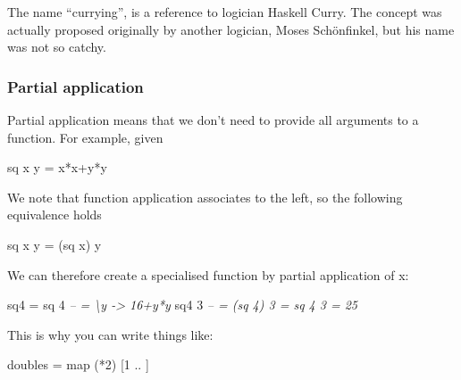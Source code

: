 \documentclass[11pt]{amsart}
\newenvironment{Shaded}{}{}
\newcommand{\DecValTok}[1]{\textcolor[rgb]{0.25,0.63,0.44}{{#1}}}
\newcommand{\CommentTok}[1]{\textcolor[rgb]{0.38,0.63,0.69}{\textit{{#1}}}}
\newcommand{\FunctionTok}[1]{\textcolor[rgb]{0.02,0.16,0.49}{{#1}}}
\newcommand{\NormalTok}[1]{{#1}}
\begin{document}
The name ``currying'', is a reference to logician Haskell Curry. The
concept was actually proposed originally by another logician, Moses
Schönfinkel, but his name was not so catchy.

\subsubsection{Partial application}\label{partial-application}

Partial application means that we don't need to provide all arguments to
a function. For example, given

\begin{Shaded}
\begin{Highlighting}[]
    \NormalTok{sq x y }\FunctionTok{=} \NormalTok{x}\FunctionTok{*}\NormalTok{x}\FunctionTok{+}\NormalTok{y}\FunctionTok{*}\NormalTok{y}
\end{Highlighting}
\end{Shaded}

We note that function application associates to the left, so the
following equivalence holds

\begin{Shaded}
\begin{Highlighting}[]
    \NormalTok{sq x y }\FunctionTok{=} \NormalTok{(sq x) y}
\end{Highlighting}
\end{Shaded}

We can therefore create a specialised function by partial application of
x:

\begin{Shaded}
\begin{Highlighting}[]
    \NormalTok{sq4 }\FunctionTok{=} \NormalTok{sq }\DecValTok{4} \CommentTok{-- = \textbackslash{}y -> 16+y*y}
    \NormalTok{sq4 }\DecValTok{3} \CommentTok{-- = (sq 4) 3 = sq 4 3 = 25}
\end{Highlighting}
\end{Shaded}

This is why you can write things like:

\begin{Shaded}
\begin{Highlighting}[]
    \NormalTok{doubles }\FunctionTok{=} \NormalTok{map (}\FunctionTok{*}\DecValTok{2}\NormalTok{) [}\DecValTok{1} \FunctionTok{..} \NormalTok{]}
\end{Highlighting}
\end{Shaded}
\end{document}
